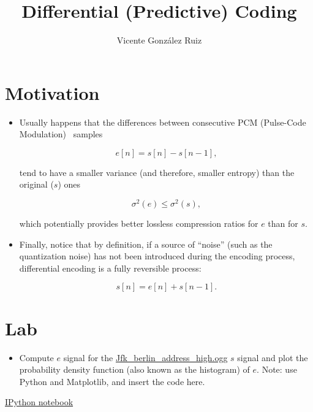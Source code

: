 \title{Differential (Predictive) Coding}
\author{Vicente González Ruiz}
\maketitle
\tableofcontents

\section{Motivation}
\begin{itemize}
\item
  Usually happens that the differences between consecutive PCM
  (Pulse-Code Modulation)~\cite{oppenheim1999discrete,
  oppenheim2014discrete} samples

  \[
    e[n] = s[n] - s[n-1],
  \]

  tend to have a smaller variance (and therefore, smaller entropy)
  than the original (\(s\)) ones

  \[
    \sigma^2(e) \leq \sigma^2(s),
  \]

  which potentially provides better lossless compression ratios for
  \(e\) than for \(s\).
\item
  Finally, notice that by definition, if a source of ``noise'' (such
  as the quantization noise) has not been introduced during the
  encoding process, differential encoding is a fully reversible
  process:

  \[
    s[n] = e[n] + s[n-1].
  \]
\end{itemize}

\section{Lab}

\begin{itemize}
\tightlist
\item
  Compute \(e\) signal for the
  \href{https://upload.wikimedia.org/wikipedia/commons/3/3a/Jfk_berlin_address_high.ogg}{Jfk\_berlin\_address\_high.ogg}
  \(s\) signal and plot the probability density function (also known
  as the histogram) of \(e\). Note: use Python and Matplotlib, and
  insert the code here.
\end{itemize}

\href{https://nbviewer.jupyter.org/github/vicente-gonzalez-ruiz/differential_coding/blob/master/DPCM.ipynb}{IPython notebook}

